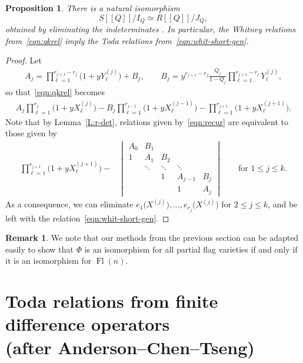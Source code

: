 \documentclass[11pt]{article}
\numberwithin{equation}{section}
\numberwithin{equation}{section}
\newtheorem{Proposition}[Theorem]{Proposition}
\theoremstyle{definition}
\newtheorem{Remark}[Theorem]{Remark}
\newcommand{\dbb}[1]{[\![#1]\!]}
\DeclareMathOperator{\Fl}{Fl}
\begin{document}
 \begin{Proposition}\label{prop:whit-toda}
 There is a natural isomorphism
 \[ S[\![Q]\!]/I_Q \simeq R\dbb{Q}/J_Q ,\]
 obtained by eliminating the indeterminates . In particular,
 the Whitney relations from~\eqref{eqn:qkrel} imply the
 Toda relations from~\eqref{eqn:whit-short-gen}.
 \end{Proposition}
 \begin{proof}
 Let
 \begin{align*}
 A_j=\prod_{\ell=1}^{r_{j+1}-r_j}\bigl(1+y Y^{(j)}_\ell\bigr)+B_j,\qquad B_j=y^{{r_{j+1}-r_j}}\frac{Q_j}{1-Q_j}\prod_{\ell=1}^{r_{j+1}-r_j}Y^{(j)}_\ell,
 \end{align*}
 so that~\eqref{eqn:qkrel} becomes
 \begin{align}\label{eqn:recur}
 A_j\prod_{\ell=1}^{r_j}\bigl(1+yX^{(j)}_\ell\bigr) -B_j\prod_{\ell=1}^{r_{j-1}}\bigl(1+yX^{(j-1)}_\ell\bigr) -\prod_{\ell=1}^{r_{j+1}}\bigl(1+y X^{(j+1)}_\ell\bigr).
 \end{align}
 Note that by Lemma~\ref{L:r-det}, relations given by~\eqref{eqn:recur} are equivalent to those given by
 \begin{align*}%
 \prod_{\ell=1}^{r_{j+1}}\bigl(1+y X^{(j+1)}_\ell\bigr)-
 &\begin{vmatrix}
 A_0 & B_1 & & & \\
 1 & A_1 & B_2 & & \\ & \ddots & \ddots & \ddots & \\ & & 1 & A_{j-1} & B_{j}\\ & & & 1 & A_{j}
 \end{vmatrix}\qquad \text{for $1\leq j\leq k$}.
 \end{align*}
 As a consequence, we can eliminate $e_1\bigl(X^{(j)}\bigr),\dots, e_{r_j}\bigl(X^{(j)}\bigr)$ for $2\leq j\leq k$, and be left with the relation~\eqref{eqn:whit-short-gen}.
 \end{proof}
\begin{Remark}\label{rmk:QKW} We note that our methods from the previous section can be adapted easily to show that $\Phi$ is an isomorphism for all partial flag varieties if and only if it is an isomorphism for $\Fl(n)$. \end{Remark}


\appendix

\section[Toda relations from finite difference operators (after Anderson--Chen--Tseng)]{Toda relations from finite difference operators\\ (after Anderson--Chen--Tseng)}\label{sec:toda}
\end{document}
